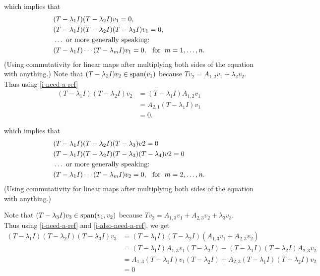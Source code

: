 \begin{prf}
  which implies that
  \begin{equation}
\begin{aligned}
    &(T-\lambda_1 I)(T-\lambda_2 I)  v_1 =0, \\
    &(T-\lambda_1 I)(T-\lambda_2 I)(T-\lambda_3 I)  v_1 =0, \\
    &\ldots \text{ or more generally speaking:} \\
    &(T-\lambda_1 I) \cdots (T-\lambda_m I) v_1 = 0,
     \;\;\, \text{for}\;\; m = 1, \ldots, n.
\end{aligned}
  \end{equation}
  (Using commutativity for linear maps after multiplying both sides of the equation with anything.)
  \bigbreak
  Note that $(T-\lambda_2 I) v_2 \in \operatorname{span} (v_1)$ because $T v_2 = A_{1,2} v_1 + \lambda_2 v_2$. Thus using \eqref{i-need-a-ref}
  \begin{equation}
    \begin{aligned}
      \label{i-also-need-a-ref}
      (T- \lambda_1 I) (T- \lambda_2 I) v_2
      &= (T- \lambda_1 I) A_{1,2}v_1  \\
      &= A_{2,1}(T- \lambda_1 I) v_1  \\
      &=0.
    \end{aligned}
  \end{equation}

  which implies that
  \begin{equation}
    \begin{aligned}
        &(T-\lambda_1 I) (T-\lambda_2 I)(T-\lambda_3)v2 = 0 \\
        &(T-\lambda_1 I) (T-\lambda_2 I)(T-\lambda_3)(T-\lambda_4)v2 = 0 \\
        &\ldots \text{ or more generally speaking:} \\
        &(T-\lambda_1 I) \cdots (T-\lambda_m I) v_2 = 0, \;\;\, \text{for}\;\; m = 2, \ldots, n.
    \end{aligned}
  \end{equation}
  (Using commutativity for linear maps after multiplying both sides of the equation with anything.)
  \bigbreak

  Note that $(T-\lambda_3 I) v_3 \in \operatorname{span} (v_1, v_2)$ because $T v_3 = A_{1,3} v_1 +   A_{2,3} v_2 + \lambda_3 v_3$. \\
  Thus using \eqref{i-need-a-ref} and \eqref{i-also-need-a-ref}, we get
  \begin{equation}
    \begin{aligned}
      (T- \lambda_1 I) (T- \lambda_2 I) (T- \lambda_3 I)v_3
      &=(T- \lambda_1 I) (T- \lambda_2 I)(A_{1,3} v_1 +   A_{2,3} v_2)  \\
        &= (T- \lambda_1 I)A_{1,3} v_1(T- \lambda_2 I)+(T- \lambda_1 I)(T- \lambda_2 I)A_{2,3} v_2 \\
        &= A_{1,3}(T- \lambda_1 I) v_1(T- \lambda_2 I)+A_{2,3}(T- \lambda_1 I)(T- \lambda_2 I) v_2 \\
            &= 0
    \end{aligned}
  \end{equation}


\end{prf}
